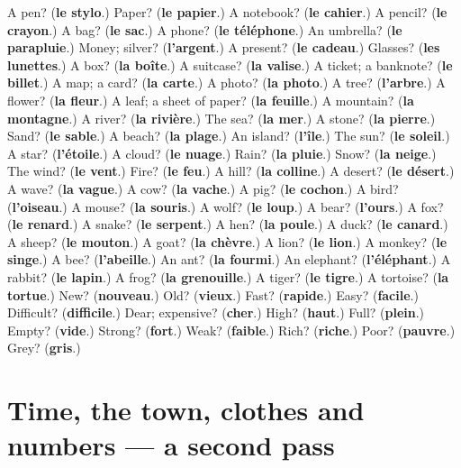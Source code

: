 \begin{tcolorbox}[breakable,colback=teal!4,colframe=teal!35!black,title={Before you move on}]
A pen? (\textbf{le stylo}.) Paper? (\textbf{le papier}.) A notebook? (\textbf{le cahier}.) A pencil? (\textbf{le crayon}.) A bag? (\textbf{le sac}.) A phone? (\textbf{le téléphone}.) An umbrella? (\textbf{le parapluie}.) Money; silver? (\textbf{l'argent}.) A present? (\textbf{le cadeau}.) Glasses? (\textbf{les lunettes}.) A box? (\textbf{la boîte}.) A suitcase? (\textbf{la valise}.) A ticket; a banknote? (\textbf{le billet}.) A map; a card? (\textbf{la carte}.) A photo? (\textbf{la photo}.) A tree? (\textbf{l'arbre}.) A flower? (\textbf{la fleur}.) A leaf; a sheet of paper? (\textbf{la feuille}.) A mountain? (\textbf{la montagne}.) A river? (\textbf{la rivière}.) The sea? (\textbf{la mer}.) A stone? (\textbf{la pierre}.) Sand? (\textbf{le sable}.) A beach? (\textbf{la plage}.) An island? (\textbf{l'île}.) The sun? (\textbf{le soleil}.) A star? (\textbf{l'étoile}.) A cloud? (\textbf{le nuage}.) Rain? (\textbf{la pluie}.) Snow? (\textbf{la neige}.) The wind? (\textbf{le vent}.) Fire? (\textbf{le feu}.) A hill? (\textbf{la colline}.) A desert? (\textbf{le désert}.) A wave? (\textbf{la vague}.) A cow? (\textbf{la vache}.) A pig? (\textbf{le cochon}.) A bird? (\textbf{l'oiseau}.) A mouse? (\textbf{la souris}.) A wolf? (\textbf{le loup}.) A bear? (\textbf{l'ours}.) A fox? (\textbf{le renard}.) A snake? (\textbf{le serpent}.) A hen? (\textbf{la poule}.) A duck? (\textbf{le canard}.) A sheep? (\textbf{le mouton}.) A goat? (\textbf{la chèvre}.) A lion? (\textbf{le lion}.) A monkey? (\textbf{le singe}.) A bee? (\textbf{l'abeille}.) An ant? (\textbf{la fourmi}.) An elephant? (\textbf{l'éléphant}.) A rabbit? (\textbf{le lapin}.) A frog? (\textbf{la grenouille}.) A tiger? (\textbf{le tigre}.) A tortoise? (\textbf{la tortue}.) New? (\textbf{nouveau}.) Old? (\textbf{vieux}.) Fast? (\textbf{rapide}.) Easy? (\textbf{facile}.) Difficult? (\textbf{difficile}.) Dear; expensive? (\textbf{cher}.) High? (\textbf{haut}.) Full? (\textbf{plein}.) Empty? (\textbf{vide}.) Strong? (\textbf{fort}.) Weak? (\textbf{faible}.) Rich? (\textbf{riche}.) Poor? (\textbf{pauvre}.) Grey? (\textbf{gris}.)
\end{tcolorbox}
\section[(dialogue)]{Time, the town, clothes and numbers — a second pass}

\label{lesson:FR-R105-second-pass-time-the-town-clothes-and-numbers}



